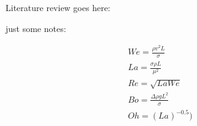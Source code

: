Literature review goes here:


just some notes:

\begin{align*}
We = \frac{\rho v^2 L}{\sigma}\\
La = \frac{\sigma \rho L}{\mu^2} \\
Re = \sqrt{LaWe}\\
Bo = \frac{\Delta \rho g L^2}{\sigma}\\
Oh = (La)^{-0.5})\\
\end{align*}
